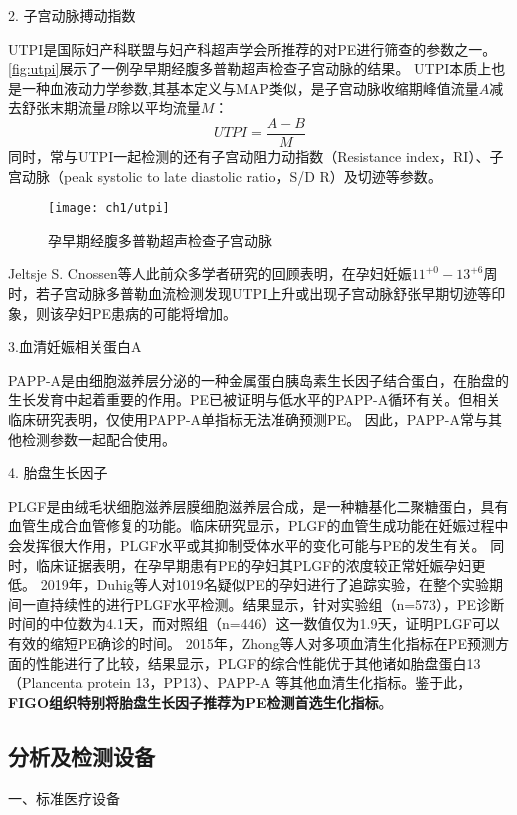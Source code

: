 2. 子宫动脉搏动指数

UTPI是国际妇产科联盟与妇产科超声学会所推荐的对PE进行筛查的参数之一\cite{FIGO,Sotiriadis2019}。\autoref{fig:utpi}展示了一例孕早期经腹多普勒超声检查子宫动脉的结果\cite{Sotiriadis2019}。
UTPI本质上也是一种血液动力学参数,其基本定义与MAP类似，是子宫动脉收缩期峰值流量$A$减去舒张末期流量$B$除以平均流量$M$\cite{Cnossen2008}：
\begin{equation}
    \label{equ:utpi}
    UTPI=\frac{A-B}{M}
\end{equation}
同时，常与UTPI一起检测的还有子宫动阻力动指数（Resistance index，RI）、子宫动脉（peak systolic to late diastolic ratio，S/D R）及切迹等参数\cite{Cnossen2008}。
\begin{figure}[htbp]
    \centering
    \texttt{[image: ch1/utpi]}
    \caption{\label{fig:utpi}孕早期经腹多普勒超声检查子宫动脉}
\end{figure}
Jeltsje S. Cnossen等人\cite{Cnossen2008}此前众多学者研究的回顾表明，在孕妇妊娠$11^{+0}-13^{+6}$周时，若子宫动脉多普勒血流检测发现UTPI上升或出现子宫动脉舒张早期切迹等印象，则该孕妇PE患病的可能将增加\cite{OAG9,Plasencia2008}。

3.血清妊娠相关蛋白A

PAPP-A是由细胞滋养层分泌的一种金属蛋白胰岛素生长因子结合蛋白，在胎盘的生长发育中起着重要的作用。PE已被证明与低水平的PAPP-A循环有关\cite{FIGO}。但相关临床研究表明，仅使用PAPP-A单指标无法准确预测PE\cite{Smith2002}。
因此，PAPP-A常与其他检测参数一起配合使用\cite{Poon2009,Tan2018,Ray2018}。 

4. 胎盘生长因子

PLGF是由绒毛状细胞滋养层膜细胞滋养层合成，是一种糖基化二聚糖蛋白，具有血管生成合血管修复的功能。临床研究显示，PLGF的血管生成功能在妊娠过程中会发挥很大作用，PLGF水平或其抑制受体水平的变化可能与PE的发生有关\cite{Levine2004,Ahmad2004}。
同时，临床证据表明，在孕早期患有PE的孕妇其PLGF的浓度较正常妊娠孕妇更低\cite{Chau2017}。
2019年，Duhig等人\cite{Duhig2019}对1019名疑似PE的孕妇进行了追踪实验，在整个实验期间一直持续性的进行PLGF水平检测。结果显示，针对实验组（n=573），PE诊断时间的中位数为4.1天，而对照组（n=446）这一数值仅为1.9天，证明PLGF可以有效的缩短PE确诊的时间。
2015年，Zhong等人\cite{Zhong2015}对多项血清生化指标在PE预测方面的性能进行了比较，结果显示，PLGF的综合性能优于其他诸如胎盘蛋白13（Plancenta protein 13，PP13）、PAPP-A
等其他血清生化指标。鉴于此，\textbf{FIGO组织特别将胎盘生长因子推荐为PE检测首选生化指标}\cite{FIGO}。

\subsection{分析及检测设备}
一、标准医疗设备

